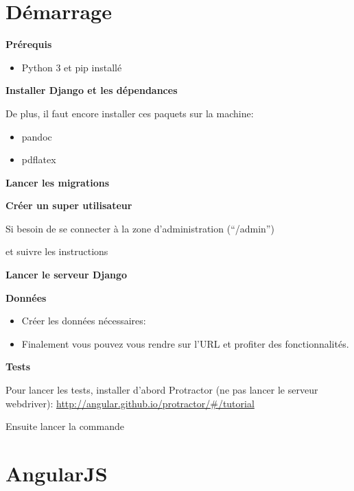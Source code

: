 \documentclass[a4paper,10pt,twoside]{sphinxmanual}
\begin{document}
\chapter{Démarrage}
\label{start:demarrage}\label{start::doc}
\textbf{Prérequis}
\begin{itemize}
\item {} 
Python 3 et pip installé

\end{itemize}

\textbf{Installer Django et les dépendances}


De plus, il faut encore installer ces paquets sur la machine:
\begin{itemize}
\item {} 
pandoc

\item {} 
pdflatex

\end{itemize}

\textbf{Lancer les migrations}


\textbf{Créer un super utilisateur}

Si besoin de se connecter à la zone d'administration (``/admin'')

 et suivre les instructions

\textbf{Lancer le serveur Django}


\textbf{Données}
\begin{itemize}
\item {} 
Créer les données nécessaires: 

\item {} 
Finalement vous pouvez vous rendre sur l'URL  et profiter des fonctionnalités.

\end{itemize}

\textbf{Tests}

Pour lancer les tests, installer d'abord Protractor (ne pas lancer le serveur webdriver): \href{http://angular.github.io/protractor/\#/tutorial}{http://angular.github.io/protractor/\#/tutorial}

Ensuite lancer la commande 


\chapter{AngularJS}
\label{angularjs::doc}\label{angularjs:angularjs}
\end{document}
